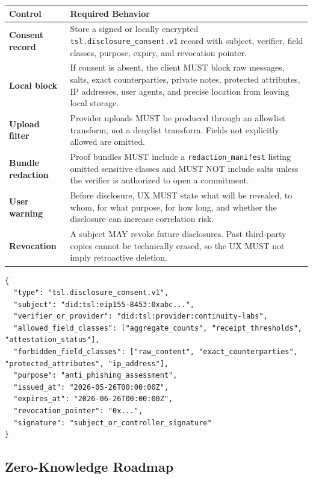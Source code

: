 \documentclass[11pt]{article}
\begin{document}
\begin{center}
\begin{tabularx}{\textwidth}{>{\bfseries}p{} X}
\toprule
Control & Required Behavior \\
\midrule
Consent record & Store a signed or locally encrypted \texttt{tsl.disclosure\_consent.v1} record with subject, verifier, field classes, purpose, expiry, and revocation pointer. \\
Local block & If consent is absent, the client MUST block raw messages, salts, exact counterparties, private notes, protected attributes, IP addresses, user agents, and precise location from leaving local storage. \\
Upload filter & Provider uploads MUST be produced through an allowlist transform, not a denylist transform. Fields not explicitly allowed are omitted. \\
Bundle redaction & Proof bundles MUST include a \texttt{redaction\_manifest} listing omitted sensitive classes and MUST NOT include salts unless the verifier is authorized to open a commitment. \\
User warning & Before disclosure, UX MUST state what will be revealed, to whom, for what purpose, for how long, and whether the disclosure can increase correlation risk. \\
Revocation & A subject MAY revoke future disclosures. Past third-party copies cannot be technically erased, so the UX MUST not imply retroactive deletion. \\
\bottomrule
\end{tabularx}
\end{center}

\begin{lstlisting}[style=tslcode]
{
  "type": "tsl.disclosure_consent.v1",
  "subject": "did:tsl:eip155-8453:0xabc...",
  "verifier_or_provider": "did:tsl:provider:continuity-labs",
  "allowed_field_classes": ["aggregate_counts", "receipt_thresholds", "attestation_status"],
  "forbidden_field_classes": ["raw_content", "exact_counterparties", "protected_attributes", "ip_address"],
  "purpose": "anti_phishing_assessment",
  "issued_at": "2026-05-26T00:00:00Z",
  "expires_at": "2026-06-26T00:00:00Z",
  "revocation_pointer": "0x...",
  "signature": "subject_or_controller_signature"
}
\end{lstlisting}

\subsection{Zero-Knowledge Roadmap}
\end{document}
